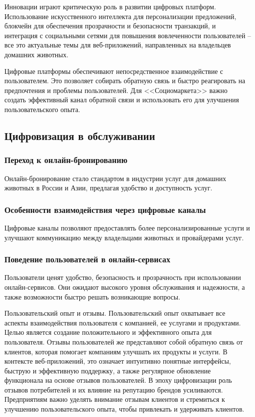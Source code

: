 Инновации играют критическую роль в развитии цифровых платформ. Использование искусственного интеллекта для персонализации предложений, блокчейн для обеспечения прозрачности и безопасности транзакций, и интеграция с социальными сетями для повышения вовлеченности пользователей – все это актуальные темы для веб-приложений, направленных на владельцев домашних животных.

Цифровые платформы обеспечивают непосредственное взаимодействие с пользователем. Это позволяет собирать обратную связь и быстро реагировать на предпочтения и проблемы пользователей. Для <<Социомаркета>> важно создать эффективный канал обратной связи и использовать его для улучшения пользовательского опыта.
\subsection{Цифровизация в обслуживании}
\subsubsection{Переход к онлайн-бронированию}

Онлайн-бронирование стало стандартом в индустрии услуг для домашних животных в России и Азии, предлагая удобство и доступность услуг.
\subsubsection{Особенности взаимодействия через цифровые каналы}

Цифровые каналы позволяют предоставлять более персонализированные услуги и улучшают коммуникацию между владельцами животных и провайдерами услуг.
\subsubsection{Поведение пользователей в онлайн-сервисах}

Пользователи ценят удобство, безопасность и прозрачность при использовании онлайн-сервисов. Они ожидают высокого уровня обслуживания и надежности, а также возможности быстро решать возникающие вопросы.

Пользовательский опыт и отзывы. Пользовательский опыт охватывает все аспекты взаимодействия пользователя с компанией, ее услугами и продуктами. Целью является создание положительного и эффективного опыта для пользователя. Отзывы пользователей же представляют собой обратную связь от клиентов, которая помогает компаниям улучшать их продукты и услуги. В контексте веб-приложений, это означает интуитивно понятные интерфейсы, быструю и эффективную поддержку, а также регулярное обновление функционала на основе отзывов пользователей. В эпоху цифровизации роль отзывов потребителей и их влияние на репутацию брендов усиливаются. Предприятиям важно уделять внимание отзывам клиентов и стремиться к улучшению пользовательского опыта, чтобы привлекать и удерживать клиентов.

